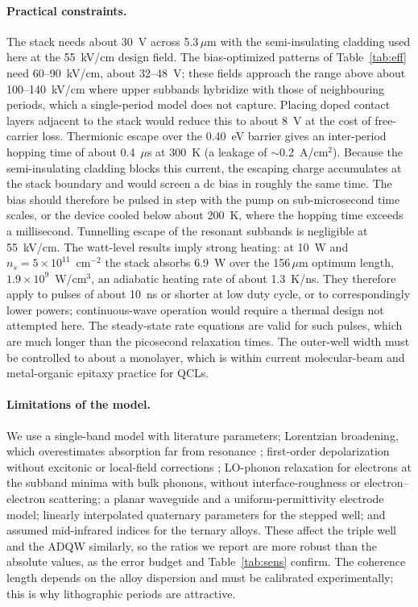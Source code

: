 \documentclass[11pt]{article}
\newcommand{\um}{\,\mu\mathrm{m}}
\begin{document}
\paragraph{Practical constraints.} The stack needs about 30~V across 5.3$\um$ with the semi-insulating cladding used here at the 55~kV/cm design field. The bias-optimized patterns of Table~\ref{tab:eff} need 60--90~kV/cm, about 32--48~V; these fields approach the range above about 100--140~kV/cm where upper subbands hybridize with those of neighbouring periods, which a single-period model does not capture. Placing doped contact layers adjacent to the stack would reduce this to about 8~V at the cost of free-carrier loss. Thermionic escape over the 0.40~eV barrier gives an inter-period hopping time of about 0.4~$\mu$s at 300~K (a leakage of $\sim$0.2~A/cm$^2$). Because the semi-insulating cladding blocks this current, the escaping charge accumulates at the stack boundary and would screen a dc bias in roughly the same time. The bias should therefore be pulsed in step with the pump on sub-microsecond time scales, or the device cooled below about 200~K, where the hopping time exceeds a millisecond. Tunnelling escape of the resonant subbands is negligible at 55~kV/cm. The watt-level results imply strong heating: at 10~W and $n_s=5\times10^{11}$~cm$^{-2}$ the stack absorbs 6.9~W over the 156$\um$ optimum length, $1.9\times10^{9}$~W/cm$^3$, an adiabatic heating rate of about 1.3~K/ns. They therefore apply to pulses of about 10~ns or shorter at low duty cycle, or to correspondingly lower powers; continuous-wave operation would require a thermal design not attempted here. The steady-state rate equations are valid for such pulses, which are much longer than the picosecond relaxation times. The outer-well width must be controlled to about a monolayer, which is within current molecular-beam and metal-organic epitaxy practice for QCLs.

\paragraph{Limitations of the model.} We use a single-band model with literature parameters; Lorentzian broadening, which overestimates absorption far from resonance \cite{Vurgaftman2021}; first-order depolarization without excitonic or local-field corrections \cite{Zaluzny1995,Heyman1994}; LO-phonon relaxation for electrons at the subband minima with bulk phonons, without interface-roughness or electron--electron scattering; a planar waveguide and a uniform-permittivity electrode model; linearly interpolated quaternary parameters for the stepped well; and assumed mid-infrared indices for the ternary alloys. These affect the triple well and the ADQW similarly, so the ratios we report are more robust than the absolute values, as the error budget and Table~\ref{tab:sens} confirm. The coherence length depends on the alloy dispersion and must be calibrated experimentally; this is why lithographic periods are attractive.
\end{document}
